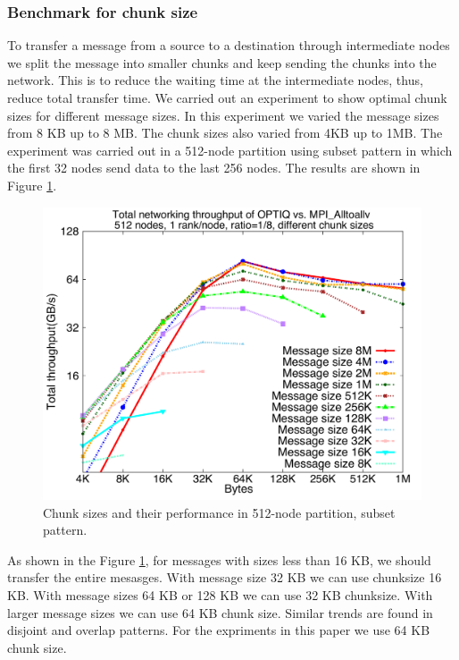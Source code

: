 \subsubsection{Benchmark for chunk size}

To transfer a message from a source to a destination through intermediate nodes we split the message into smaller chunks and keep sending the chunks into the network. This is to reduce the waiting time at the intermediate nodes, thus, reduce total transfer time. We carried out an experiment to show optimal chunk sizes for different message sizes. In this experiment we varied the message sizes from 8 KB up to 8 MB. The chunk sizes also varied from 4KB up to 1MB. The experiment was carried out in a 512-node partition using subset pattern in which the first 32 nodes send data to the last 256 nodes. The results are shown in Figure \ref{fig:chunksize}.

\begin{figure}[!htb]
\vspace{-0.1in}
\centering
\includegraphics[scale=0.30]{figures/87_chunksize.pdf}
\vspace{-0.1in}
\caption{Chunk sizes and their performance in 512-node partition, subset pattern.}
\vspace{-0.1in}
\label{fig:chunksize}
\end{figure}

As shown in the Figure \ref{fig:chunksize}, for messages with sizes less than 16 KB, we should transfer the entire mesasges. With message size 32 KB we can use chunksize 16 KB. With message sizes 64 KB or 128 KB we can use 32 KB chunksize. With larger message sizes we can use 64 KB chunk size. Similar trends are found in disjoint and overlap patterns. For the expriments in this paper we use 64 KB chunk size.
